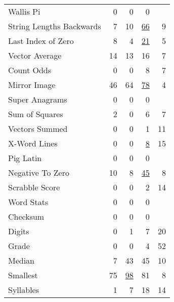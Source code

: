 \documentclass{sig-alternate}
\begin{document}
\begin{table}[t]
\begin{tabular}{lrrr|r}
Wallis Pi                  & 0       & 0   & 0        &     \\
String Lengths Backwards   & 7       & 10  & \underline{66}       & 9    \\
Last Index of Zero         & 8       & 4   & \underline{21}       & 5    \\
Vector Average             & 14      & 13  & 16       & 7    \\
Count Odds                 & 0       & 0   & 8        & 7    \\
Mirror Image               & 46      & 64  & \underline{78}       & 4    \\
Super Anagrams             & 0       & 0   & 0        &     \\
Sum of Squares             & 2       & 0   & 6        & 7    \\
Vectors Summed             & 0       & 0   & 1        & 11   \\
X-Word Lines               & 0       & 0   & \underline{8}        & 15   \\
Pig Latin                  & 0       & 0   & 0        &     \\
Negative To Zero           & 10      & 8   & \underline{45}       & 8    \\
Scrabble Score             & 0       & 0   & 2        & 14   \\
Word Stats                 & 0       & 0   & 0        &     \\
Checksum                   & 0       & 0   & 0        &     \\
Digits                     & 0       & 1   & 7        & 20   \\
Grade                      & 0       & 0   & 4        & 52   \\
Median                     & 7       & 43  & 45       & 10   \\
Smallest                   & 75      & \underline{98}  & 81       & 8    \\
Syllables                  & 1       & 7   & 18       & 14   \\

\end{tabular}
\end{table}
\end{document}
